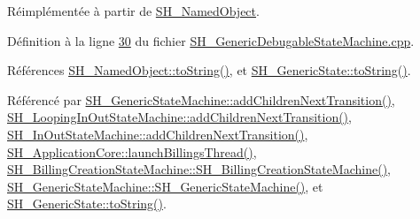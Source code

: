 Réimplémentée à partir de \hyperlink{classSH__NamedObject_a9f4b19df6a96a17daaf1060b3019ef47}{S\-H\-\_\-\-Named\-Object}.



Définition à la ligne \hyperlink{SH__GenericDebugableStateMachine_8cpp_source_l00030}{30} du fichier \hyperlink{SH__GenericDebugableStateMachine_8cpp_source}{S\-H\-\_\-\-Generic\-Debugable\-State\-Machine.\-cpp}.



Références \hyperlink{classSH__NamedObject_a9f4b19df6a96a17daaf1060b3019ef47}{S\-H\-\_\-\-Named\-Object\-::to\-String()}, et \hyperlink{classSH__GenericState_a7779babbb40f3f8faa71112204d9804f}{S\-H\-\_\-\-Generic\-State\-::to\-String()}.



Référencé par \hyperlink{classSH__GenericStateMachine_a22433f8df2f41120a05bfa4bbfa9e0ae}{S\-H\-\_\-\-Generic\-State\-Machine\-::add\-Children\-Next\-Transition()}, \hyperlink{classSH__LoopingInOutStateMachine_abfae9f47019379f270496de46845c729}{S\-H\-\_\-\-Looping\-In\-Out\-State\-Machine\-::add\-Children\-Next\-Transition()}, \hyperlink{classSH__InOutStateMachine_aa78420f8778d7777809aad77eb8473b4}{S\-H\-\_\-\-In\-Out\-State\-Machine\-::add\-Children\-Next\-Transition()}, \hyperlink{classSH__ApplicationCore_aa0777211696005ec89b2effe06190c3b}{S\-H\-\_\-\-Application\-Core\-::launch\-Billings\-Thread()}, \hyperlink{classSH__BillingCreationStateMachine_ad62b77fa4aeafe200056ff3974562f83}{S\-H\-\_\-\-Billing\-Creation\-State\-Machine\-::\-S\-H\-\_\-\-Billing\-Creation\-State\-Machine()}, \hyperlink{classSH__GenericStateMachine_ac34a1ac375e680e27708097c4f099f59}{S\-H\-\_\-\-Generic\-State\-Machine\-::\-S\-H\-\_\-\-Generic\-State\-Machine()}, et \hyperlink{classSH__GenericState_a7779babbb40f3f8faa71112204d9804f}{S\-H\-\_\-\-Generic\-State\-::to\-String()}.


